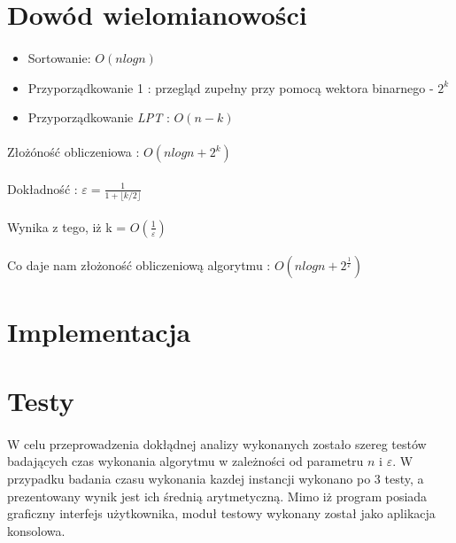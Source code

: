 \documentclass[wide,a4paper,titlepage,12pt] {article}
\begin{document}
\section{Dowód wielomianowości}
\paragraph{}
\begin{itemize}
  \item Sortowanie: $O(nlogn)$
  \item Przyporządkowanie 1 : przegląd zupełny przy pomocą wektora binarnego - $2^k$
  \item Przyporządkowanie \textit{LPT} : $O(n-k)$
\end{itemize}

\paragraph{}
Złożóność obliczeniowa : $O(nlogn + 2^k)$
\paragraph{}
Dokładność : 
$\varepsilon = \frac{1}{1+\lfloor k/2 \rfloor}$
\paragraph{}
 Wynika z tego, iż k = $O(\frac{1}{\varepsilon})$
\paragraph{}
Co daje nam złożoność obliczeniową algorytmu : $O(nlogn + 2^{\frac{1}{\varepsilon}})$

\section{Implementacja}
\paragraph{}

\section{Testy}
\paragraph{}
W celu przeprowadzenia dokłądnej analizy wykonanych zostało szereg testów badających czas wykonania algorytmu w zależności od parametru $n$ i $\varepsilon$. W przypadku badania czasu wykonania kazdej instancji wykonano po 3 testy, a prezentowany wynik jest ich średnią arytmetyczną. Mimo iż program posiada graficzny interfejs użytkownika, moduł testowy wykonany został jako aplikacja konsolowa.
\end{document}

